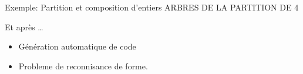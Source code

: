 \documentclass{beamer}
\begin{document}
\begin{frame}{Exemple: Partition et composition d'entiers}
ARBRES DE LA PARTITION DE 4
\end{frame}

\begin{frame}{Et après \ldots}
\begin{itemize}
\item Génération automatique de code
\item Probleme de reconnisance de forme.
\end{itemize}
\end{frame}

  


\end{document}

